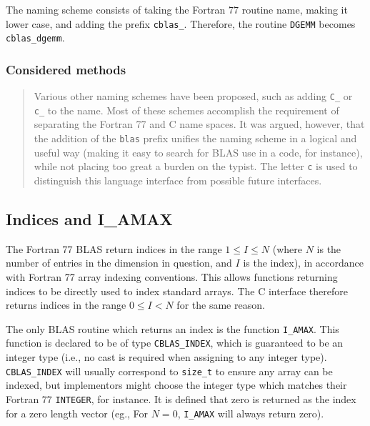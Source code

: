 \documentclass{article}
\begin{document}
The naming scheme consists of taking the Fortran 77 routine name, making it
lower case, and adding the prefix {\tt cblas\_}.  Therefore, the routine
{\tt DGEMM} becomes {\tt cblas\_dgemm}.

\subsubsection{Considered methods}
{\it
\begin{quotation}
Various other naming schemes have been proposed, such as adding {\tt C\_} 
or {\tt c\_} to the name.  Most of these schemes accomplish the requirement
of separating the Fortran 77 and C name spaces.  It was argued, however, that
the addition of the {\tt blas} prefix unifies the naming scheme in a logical
and useful way (making it easy to search for BLAS use in a code, for instance),
while not placing too great a burden on the typist.  The letter {\tt c} is used
to distinguish this language interface from possible future interfaces.
\end{quotation}
}

\subsection{Indices and I\_AMAX} \label{sec-Indices}


The Fortran 77 BLAS return indices in the range $1 \leq I \leq N$ (where $N$
is the number of entries in the dimension in question, and $I$ is the index),
in accordance with Fortran 77 array indexing conventions.  This allows functions
returning indices to be directly used to index standard arrays.  The C interface 
therefore returns indices in the range $0 \leq I < N$ for the same reason.

The only BLAS routine which returns an index is the function {\tt I\_AMAX}.
This function is declared to be of type {\tt CBLAS\_INDEX}, which is guaranteed
to be an integer type (i.e., no cast is required when assigning to any integer
type).  {\tt CBLAS\_INDEX} will usually correspond to {\tt size\_t} to ensure
any array can be indexed, but implementors might choose the integer type which
matches their Fortran 77 {\tt INTEGER}, for instance.  It is defined that zero
is returned as the index for a zero length vector (eg., For $N=0$, 
{\tt I\_AMAX} will always return zero).
\end{document}
